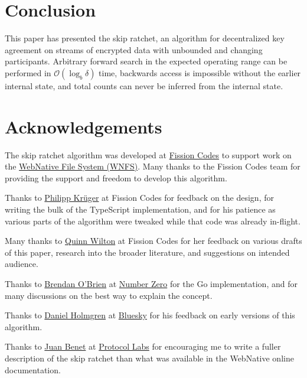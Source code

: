 \documentclass[twocolumn]{article}
\begin{document}
	\section{Conclusion}
	
	This paper has presented the skip ratchet, an algorithm for decentralized key agreement on streams of encrypted data with unbounded and changing participants. Arbitrary forward search in the expected operating range can be performed in $\mathcal{O}(\log_{b} \delta)$ time, backwards access is impossible without the earlier internal state, and total counts can never be inferred from the internal state.
    
    \section{Acknowledgements}
    
    The skip ratchet algorithm was developed at \href{https://fission.codes}{Fission Codes} to support work on the \href{https://github.com/fission-suite/webnative}{WebNative File System (WNFS)}. Many thanks to the Fission Codes team for providing the support and freedom to develop this algorithm.
    
    Thanks to \href{https://github.com/matheus23/}{Philipp Krüger} at Fission Codes for  feedback on the design, for writing the bulk of the TypeScript implementation\cite{ts-wnfs-ratchet}, and for his patience as various parts of the algorithm were tweaked while that code was already in-flight.
    
    Many thanks to \href{https://github.com/QuinnWilton}{Quinn Wilton} at Fission Codes for her feedback on various drafts of this paper, research into the broader literature, and suggestions on intended audience.
    
    Thanks to \href{https://github.com/b5/}{Brendan O'Brien} at \href{https://n0.computer/}{Number Zero} for the {Go implementation}\cite{go-wnfs-ratchet}, and for many discussions on the best way to explain the concept.
    
    Thanks to \href{https://github.com/dholms}{Daniel Holmgren} at \href{https://blueskyweb.xyz}{Bluesky} for his feedback on early versions of this algorithm.
    
    Thanks to \href{https://github.com/jbenet/}{Juan Benet} at \href{https://protocol.ai/}{Protocol Labs} for encouraging me to write a fuller description of the skip ratchet than what was available in the WebNative online documentation.

    \printbibliography[title={References}]
\end{document}
